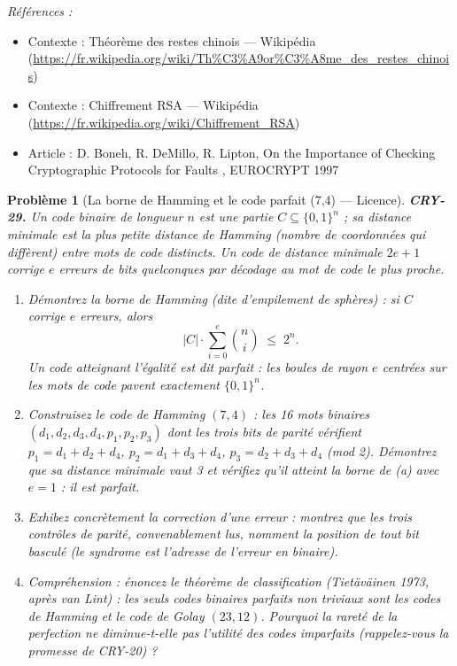 \documentclass[11pt]{article}
\newtheorem{problem}{Problème}
\newenvironment{refs}{\par\small\noindent\emph{Références :}\begin{itemize}\setlength\itemsep{0pt}}{\end{itemize}\normalsize}
\begin{document}
\begin{refs}
\item Contexte : Théorème des restes chinois --- Wikipédia (\url{https://fr.wikipedia.org/wiki/Th%C3%A9or%C3%A8me_des_restes_chinois})
\item Contexte : Chiffrement RSA --- Wikipédia (\url{https://fr.wikipedia.org/wiki/Chiffrement_RSA})
\item Article : D. Boneh, R. DeMillo, R. Lipton, \og{} On the Importance of Checking Cryptographic Protocols for Faults \fg{}, EUROCRYPT 1997
\end{refs}

\bigskip

\begin{problem}[{La borne de Hamming et le code parfait (7,4) --- Licence}]
\textbf{CRY-29.} Un code binaire de longueur $n$ est une partie
$C \subseteq \{0,1\}^n$ ; sa distance minimale est la plus petite distance de Hamming
(nombre de coordonnées qui diffèrent) entre mots de code distincts. Un code de distance
minimale $2e+1$ corrige $e$ erreurs de bits quelconques par décodage au mot de code le
plus proche.
\begin{enumerate}
\item[(a)] Démontrez la borne de Hamming (dite d'empilement de sphères) : si $C$ corrige $e$
erreurs, alors
\[ |C| \cdot \sum_{i=0}^{e} \binom{n}{i} \;\le\; 2^n . \]
Un code atteignant l'égalité est dit \textit{parfait} : les boules de rayon $e$ centrées sur
les mots de code pavent exactement $\{0,1\}^n$.
\item[(b)] Construisez le code de Hamming $(7,4)$ : les 16 mots binaires
$(d_1,d_2,d_3,d_4,p_1,p_2,p_3)$ dont les trois bits de parité vérifient
$p_1 = d_1{+}d_2{+}d_4$, $p_2 = d_1{+}d_3{+}d_4$, $p_3 = d_2{+}d_3{+}d_4$
(mod 2). Démontrez que sa distance minimale vaut 3 et vérifiez qu'il atteint la borne de (a)
avec $e = 1$ : il est parfait.
\item[(c)] Exhibez concrètement la correction d'une erreur : montrez que les trois contrôles de
parité, convenablement lus, nomment la position de tout bit basculé (le syndrome \textit{est}
l'adresse de l'erreur en binaire).
\item[(d)] Compréhension : énoncez le théorème de classification (Tietäväinen 1973, après van
Lint) : les seuls codes binaires parfaits non triviaux sont les codes de Hamming et le
code de Golay $(23,12)$. Pourquoi la rareté de la perfection ne diminue-t-elle pas
l'utilité des codes imparfaits (rappelez-vous la promesse de CRY-20) ?
\end{enumerate}

\end{problem}
\end{document}
